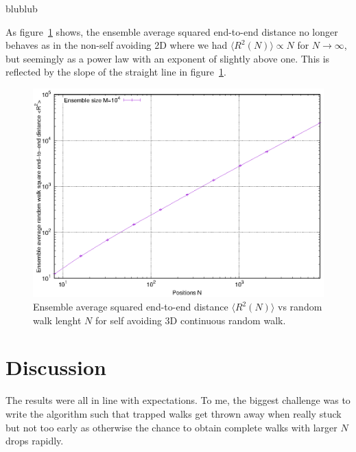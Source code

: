 \documentclass[11pt,a4paper]{article}
\begin{document}
blublub

As figure~\ref{fig:2b} shows, the ensemble average squared end-to-end distance no longer behaves as in the non-self avoiding
2D where we had $\langle R^2(N) \rangle \propto N$ for $N \rightarrow \infty$, but seemingly as a power law with an exponent
of slightly above one. This is reflected by the slope of the straight line in figure~\ref{fig:2b}.

\begin{figure}[ht]
	\begin{center}
	\includegraphics[scale=1.2]{figure2b.eps} 
	\end{center}
	\caption{Ensemble average squared end-to-end distance $\langle R^2(N)\rangle$ vs random walk lenght $N$ for self avoiding 3D continuous random walk.}
	\label{fig:2b}
	\end{figure}



\section{Discussion}
The results were all in line with expectations. To me, the biggest challenge was to write the algorithm such that trapped
walks get thrown away when really stuck but not too early as otherwise the chance to obtain complete walks with larger $N$ 
drops rapidly.







\end{document}
